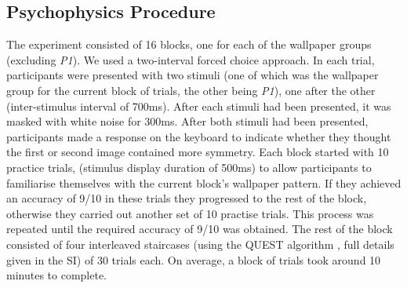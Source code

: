 \documentclass[11pt, twoside]{article}
\begin{document}
\subsection*{Psychophysics Procedure}
The experiment consisted of 16 blocks, one for each of the wallpaper groups (excluding \textit{P1}). We used a two-interval forced choice approach. In each trial, participants were presented with two stimuli (one of which was the wallpaper group for the current block of trials, the other being \textit{P1}), one after the other (inter-stimulus interval of 700ms). After each stimuli had been presented, it was masked with white noise for 300ms. After both stimuli had been presented, participants made a response on the keyboard to indicate whether they thought the first or second image contained more symmetry. Each block started with 10 practice trials, (stimulus display duration of 500ms) to allow participants to familiarise themselves with the current block's wallpaper pattern. If they achieved an accuracy of 9/10 in these trials they progressed to the rest of the block, otherwise they carried out another set of 10 practise trials. This process was repeated until the required accuracy of 9/10 was obtained. The rest of the block consisted of four interleaved staircases (using the QUEST algorithm \cite{watson1983quest}, full details given in the SI) of 30 trials each. On average, a block of trials took around 10 minutes to complete. 
\end{document}

